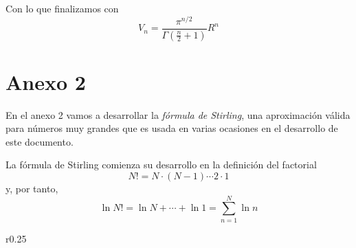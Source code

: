 Con lo que finalizamos con
\begin{equation}
	V_n = \frac{\pi^{n/2}}{\Gamma\left(\frac{n}{2} + 1 \right)}R^n
\end{equation}

\newpage
\section*{Anexo 2}\label{Anx2}
\renewcommand{\theequation}{A\textsubscript{2}.\arabic{equation}}
\setcounter{equation}{0}

En el anexo 2 vamos a desarrollar la \emph{fórmula de Stirling}, una aproximación válida para números muy grandes que es usada en varias ocasiones en el desarrollo de este documento.

La fórmula de Stirling comienza su desarrollo en la definición del factorial
\begin{equation}
	N! = N\cdot (N-1) \cdots 2 \cdot 1
\end{equation}
y, por tanto,
\begin{equation}
	\ln N! = \ln N + \cdots + \ln 1 = \sum_{n=1}^{N} \ln n
\end{equation}

\begin{wrapfigure}{r}{0.25\textwidth}
	\centering
	\hspace{2.5cm}
	\vspace{-0.5cm}
\end{wrapfigure}

